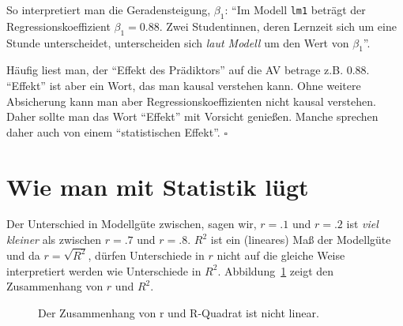 \documentclass[
  letterpaper,
  twoside,
  open=any]{scrbook}
\theoremstyle{definition}
\theoremstyle{definition}
\theoremstyle{definition}
\theoremstyle{remark}
\begin{document}
So interpretiert man die Geradensteigung, \(\beta_1\): \enquote{Im
Modell \texttt{lm1} beträgt der Regressionskoeffizient
\(\beta_1 = 0.88\). Zwei Studentinnen, deren Lernzeit sich um eine
Stunde unterscheidet, unterscheiden sich \emph{laut Modell} um den Wert
von \(\beta_1\)}.

\begin{tcolorbox}[enhanced jigsaw, colframe=quarto-callout-caution-color-frame, arc=.35mm, leftrule=.75mm, bottomtitle=1mm, titlerule=0mm, colbacktitle=quarto-callout-caution-color!10!white, breakable, bottomrule=.15mm, colback=white, left=2mm, rightrule=.15mm, opacityback=0, toptitle=1mm, toprule=.15mm, opacitybacktitle=0.6, title=\textcolor{quarto-callout-caution-color}{\faFire}\hspace{0.5em}{Vorsicht}, coltitle=black]

Häufig liest man, der \enquote{Effekt des Prädiktors} auf die AV betrage
z.B. \(0.88\). \enquote{Effekt} ist aber ein Wort, das man kausal
verstehen kann. Ohne weitere Absicherung kann man aber
Regressionskoeffizienten nicht kausal verstehen. Daher sollte man das
Wort \enquote{Effekt} mit Vorsicht genießen. Manche sprechen daher auch
von einem \enquote{statistischen Effekt}. \(\square\)

\end{tcolorbox}

\section{Wie man mit Statistik
lügt}\label{wie-man-mit-statistik-luxfcgt-4}

Der Unterschied in Modellgüte zwischen, sagen wir, \(r=.1\) und \(r=.2\)
ist \emph{viel kleiner} als zwischen \(r=.7\) und \(r=.8\). \(R^2\) ist
ein (lineares) Maß der Modellgüte und da \(r = \sqrt{R^2}\), dürfen
Unterschiede in \(r\) nicht auf die gleiche Weise interpretiert werden
wie Unterschiede in \(R^2\). Abbildung~\ref{fig-r-r2} zeigt den
Zusammenhang von \(r\) und \(R^2\).

\begin{figure}


\caption{\label{fig-r-r2}Der Zusammenhang von r und R-Quadrat ist nicht
linear.}

\end{figure}%
\end{document}
